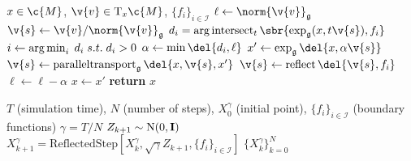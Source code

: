 \begin{algorithm}[t]
	\begin{algorithmic}
		\Require \(x \in \c{M}\), \(\v{v} \in \mathrm{T}_x\c{M}\), \(\{f_i\}_{i \in \mathcal{I}}\)
		\State \(\ell \gets \norm{\v{v}}_\mathfrak{g}\)
		\State \(\v{s} \gets \v{v} / \norm{\v{v}}_\mathfrak{g}\)
		\State \(d_i = \arg \intersect_t\sbr{\exp_\mathfrak{g}(x, t\v{s}), f_i}\)
		\State \(i \gets \operatorname*{\arg\min}_i\; d_i \; s.t. \; d_i > 0\)
		\State \(\alpha \gets \min\del{d_i, \ell} \)
		\State \(x' \gets \exp_\mathfrak{g}\del{x, \alpha\v{s}}\)
		\State \(\v{s} \gets \paralleltransport_\mathfrak{g}\del{x, \v{s}, x'} \)
		\State \(\v{s} \gets \reflect\del{\v{s}, f_i}\)
		\State \(\ell \gets \ell - \alpha\)
		\State \(x \gets x'\)
		\EndWhile
		\State \textbf{return} \(x\)
	\end{algorithmic}
	\caption{\emph{Reflected step algorithm}.
		The algorithm operates by repeatedly taking geodesic steps until one of the constraints is violated, or the step is fully taken.
		Upon hitting the boundary we parallel transport the tangent vector to the boundary and then reflect it against the boundary.
		We then start a new geodesic from this point in the new direction.
		The \({\arg} \intersect_t\) function computes the distance one must travel along a geodesic in direction \(\v{s}\) til constraint \(f_i\) is intersected.
		For a discussion of \(\paralleltransport\), \(\exp_\mathfrak{g}\) and \(\reflect\) please see \cref{sec:riemannain_intro_dupref}.
	}
	\label{alg:reflection}
\end{algorithm}

\begin{algorithm}[t]
	\caption{\emph{Reflected Random Walk}.
		Discretisation of the SDE $\mathrm{d} \v{X}_t = b(t, \v{X}_t) \mathrm{d} t + \mathrm{d} \v{B}_t - \mathrm{d} \v{k}_t$.
	}
	\label{alg:rrw}
	\begin{algorithmic}
		 $T$ (simulation time), $N$ (number of steps), $X_0^\gamma$ (initial point), $\{f_i\}_{i \in \mathcal{I}}$ (boundary functions)
		\State $\gamma = T / N$
		\For{$k \in \{0, \dots, N-1\}$}
		\State $Z_{k+1} \sim \mathrm{N}(0, \m{I})$
		\State $X_{k+1}^\gamma = \text{ReflectedStep}[X_{k}^\gamma, \sqrt{\gamma}
			Z_{k+1}, \{f_i\}_{i \in \mathcal{I}}]$ \EndFor {} $\{ X_k^\gamma\}_{k=0}^{N}$ \end{algorithmic} \end{algorithm} 

